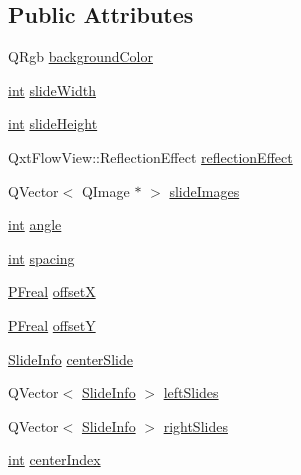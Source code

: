 \subsection*{Public Attributes}
\begin{DoxyCompactItemize}
\item 
Q\-Rgb \hyperlink{class_qxt_flow_view_state_a2dd86ff04aca360d87e10f1b4bafb9a8}{background\-Color}
\item 
\hyperlink{ioapi_8h_a787fa3cf048117ba7123753c1e74fcd6}{int} \hyperlink{class_qxt_flow_view_state_a7f91c4d0a9c63db943552ab450c380b3}{slide\-Width}
\item 
\hyperlink{ioapi_8h_a787fa3cf048117ba7123753c1e74fcd6}{int} \hyperlink{class_qxt_flow_view_state_ad99364d285780d8b4c2d4b50dbe86fdc}{slide\-Height}
\item 
Qxt\-Flow\-View\-::\-Reflection\-Effect \hyperlink{class_qxt_flow_view_state_a0b8d2993bdd30ef9f3dc2bc4354c6fc2}{reflection\-Effect}
\item 
Q\-Vector$<$ Q\-Image $\ast$ $>$ \hyperlink{class_qxt_flow_view_state_ae0efba9dbd03593eca649060d96d0073}{slide\-Images}
\item 
\hyperlink{ioapi_8h_a787fa3cf048117ba7123753c1e74fcd6}{int} \hyperlink{class_qxt_flow_view_state_ab2586ef4da980b61b49c4fff8f9cab4d}{angle}
\item 
\hyperlink{ioapi_8h_a787fa3cf048117ba7123753c1e74fcd6}{int} \hyperlink{class_qxt_flow_view_state_ad67cb493f65ff79cec2f243cc994ba96}{spacing}
\item 
\hyperlink{qxtflowview__p_8h_af0b7719267685844f4989a9279e712b9}{P\-Freal} \hyperlink{class_qxt_flow_view_state_a1e70b9c026c4dc5b031a4e72cb3fe1f6}{offset\-X}
\item 
\hyperlink{qxtflowview__p_8h_af0b7719267685844f4989a9279e712b9}{P\-Freal} \hyperlink{class_qxt_flow_view_state_aaaf7d775e1f33c14e264c1ba7b790e9f}{offset\-Y}
\item 
\hyperlink{struct_slide_info}{Slide\-Info} \hyperlink{class_qxt_flow_view_state_a1507fe243c77c752d0e26b36f9c40687}{center\-Slide}
\item 
Q\-Vector$<$ \hyperlink{struct_slide_info}{Slide\-Info} $>$ \hyperlink{class_qxt_flow_view_state_a449b621c06c13e72b4a8a76061236487}{left\-Slides}
\item 
Q\-Vector$<$ \hyperlink{struct_slide_info}{Slide\-Info} $>$ \hyperlink{class_qxt_flow_view_state_ad3d83aae413b0c03b09978e40cb4926b}{right\-Slides}
\item 
\hyperlink{ioapi_8h_a787fa3cf048117ba7123753c1e74fcd6}{int} \hyperlink{class_qxt_flow_view_state_a3b0c0becb59a58e5fc69b9c55a12716a}{center\-Index}
\end{DoxyCompactItemize}


